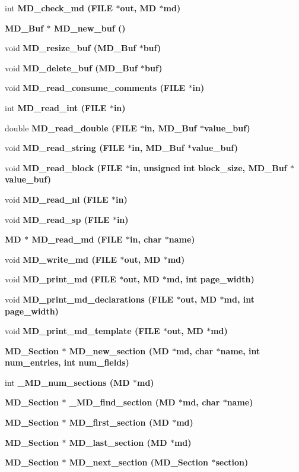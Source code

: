 \begin{CompactItemize}
int \bf{MD\_\-check\_\-md} (FILE $\ast$out, \bf{MD} $\ast$md)
\item 
\bf{MD\_\-Buf} $\ast$ \bf{MD\_\-new\_\-buf} ()
\item 
void \bf{MD\_\-resize\_\-buf} (\bf{MD\_\-Buf} $\ast$buf)
\item 
void \bf{MD\_\-delete\_\-buf} (\bf{MD\_\-Buf} $\ast$buf)
\item 
void \bf{MD\_\-read\_\-consume\_\-comments} (FILE $\ast$in)
\item 
int \bf{MD\_\-read\_\-int} (FILE $\ast$in)
\item 
double \bf{MD\_\-read\_\-double} (FILE $\ast$in, \bf{MD\_\-Buf} $\ast$value\_\-buf)
\item 
void \bf{MD\_\-read\_\-string} (FILE $\ast$in, \bf{MD\_\-Buf} $\ast$value\_\-buf)
\item 
void \bf{MD\_\-read\_\-block} (FILE $\ast$in, unsigned int block\_\-size, \bf{MD\_\-Buf} $\ast$value\_\-buf)
\item 
void \bf{MD\_\-read\_\-nl} (FILE $\ast$in)
\item 
void \bf{MD\_\-read\_\-sp} (FILE $\ast$in)
\item 
\bf{MD} $\ast$ \bf{MD\_\-read\_\-md} (FILE $\ast$in, char $\ast$\bf{name})
\item 
void \bf{MD\_\-write\_\-md} (FILE $\ast$out, \bf{MD} $\ast$md)
\item 
void \bf{MD\_\-print\_\-md} (FILE $\ast$out, \bf{MD} $\ast$md, int page\_\-width)
\item 
void \bf{MD\_\-print\_\-md\_\-declarations} (FILE $\ast$out, \bf{MD} $\ast$md, int page\_\-width)
\item 
void \bf{MD\_\-print\_\-md\_\-template} (FILE $\ast$out, \bf{MD} $\ast$md)
\item 
\bf{MD\_\-Section} $\ast$ \bf{MD\_\-new\_\-section} (\bf{MD} $\ast$md, char $\ast$\bf{name}, int num\_\-entries, int num\_\-fields)
\item 
int \bf{\_\-MD\_\-num\_\-sections} (\bf{MD} $\ast$md)
\item 
\bf{MD\_\-Section} $\ast$ \bf{\_\-MD\_\-find\_\-section} (\bf{MD} $\ast$md, char $\ast$\bf{name})
\item 
\bf{MD\_\-Section} $\ast$ \bf{MD\_\-first\_\-section} (\bf{MD} $\ast$md)
\item 
\bf{MD\_\-Section} $\ast$ \bf{MD\_\-last\_\-section} (\bf{MD} $\ast$md)
\item 
\bf{MD\_\-Section} $\ast$ \bf{MD\_\-next\_\-section} (\bf{MD\_\-Section} $\ast$section)
\item 

\end{CompactItemize}
